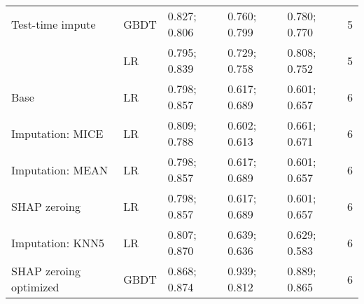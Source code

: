 \begin{tabular}{llllll}
Test-time impute & GBDT &  0.827;  0.806 &  0.760;  0.799 &  0.780;  0.770 &    5 \\
                       & LR &  0.795;  0.839 &  0.729;  0.758 &  0.808;  0.752 &    5 \\
Base & LR &  0.798;  0.857 &  0.617;  0.689 &  0.601;  0.657 &    6 \\
Imputation: MICE & LR &  0.809;  0.788 &  0.602;  0.613 &  0.661;  0.671 &    6 \\
Imputation: MEAN & LR &  0.798;  0.857 &  0.617;  0.689 &  0.601;  0.657 &    6 \\
SHAP zeroing & LR &  0.798;  0.857 &  0.617;  0.689 &  0.601;  0.657 &    6 \\
Imputation: KNN5 & LR &  0.807;  0.870 &  0.639;  0.636 &  0.629;  0.583 &    6 \\
SHAP zeroing optimized & GBDT &  0.868;  0.874 &  0.939;  0.812 &  0.889;  0.865 &    6 \\
\bottomrule
\end{tabular}

